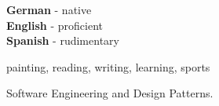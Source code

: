 \documentclass[9pt]{developercv} %
\begin{document}

\begin{minipage}[t]{0.265\textwidth}
	\vspace{-\baselineskip} %
	
	
	\textbf{German} - native\\
	\textbf{English} - proficient\\
	\textbf{Spanish} - rudimentary
\end{minipage}
\hfill
\begin{minipage}[t]{0.3\textwidth}
	\vspace{-\baselineskip} %
	
	
	painting, reading, writing, learning, sports
\end{minipage}
\hfill
\begin{minipage}[t]{0.3\textwidth}
	\vspace{-\baselineskip} %
	
	
	Software Engineering and Design Patterns.
\end{minipage}

\end{document}
